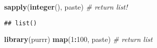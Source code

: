 \documentclass[
]{book}
\newenvironment{Shaded}{\begin{snugshade}}{\end{snugshade}}
\newcommand{\CommentTok}[1]{\textcolor[rgb]{0.56,0.35,0.01}{\textit{#1}}}
\newcommand{\DecValTok}[1]{\textcolor[rgb]{0.00,0.00,0.81}{#1}}
\newcommand{\KeywordTok}[1]{\textcolor[rgb]{0.13,0.29,0.53}{\textbf{#1}}}
\newcommand{\NormalTok}[1]{#1}
\newcommand{\OperatorTok}[1]{\textcolor[rgb]{0.81,0.36,0.00}{\textbf{#1}}}
\begin{document}
\begin{Shaded}
\begin{Highlighting}[]
\KeywordTok{sapply}\NormalTok{(}\KeywordTok{integer}\NormalTok{(), paste) }\CommentTok{\# return list!}
\end{Highlighting}
\end{Shaded}

\begin{verbatim}
## list()
\end{verbatim}

\begin{Shaded}
\begin{Highlighting}[]
\KeywordTok{library}\NormalTok{(purrr)}
\KeywordTok{map}\NormalTok{(}\DecValTok{1}\OperatorTok{:}\DecValTok{100}\NormalTok{, paste) }\CommentTok{\# return list}
\end{Highlighting}
\end{Shaded}
\end{document}
